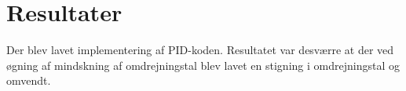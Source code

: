 

\section{Resultater}
\label{sec:resultater}

Der blev lavet implementering af PID-koden. Resultatet var desværre at der ved øgning af mindskning af omdrejningstal blev lavet en stigning i omdrejningstal og omvendt.


% 



